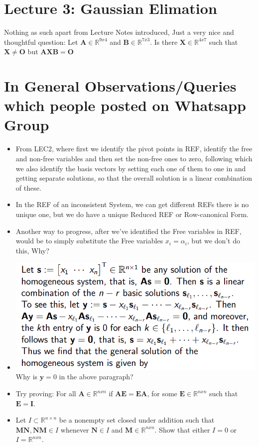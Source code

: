 \documentclass{article}
\begin{document}
\section{Lecture 3: Gaussian Elimation}
Nothing as such apart from Lecture Notes introduced,
Just a very nice and thoughtful question:
Let $\mathbf{A} \in \mathbb{R}^{9x4}$ and $\mathbf{B} \in \mathbb{R}^{7x3}$. Is there $\mathbf{X}
\in \mathbb{R}^{4x7}$ such that $\mathbf{X} \ne \mathbf{O}$ but $\mathbf{AXB = O}$

\section{In General Observations/Queries which people posted on Whatsapp Group}
\begin{itemize}
  \item From LEC2, where first we identify the pivot points in REF, identify the free and non-free variables
  and then set the non-free ones to zero, following which we also identify the basis vectors by setting each one of
  them to one in and getting separate solutions, so that the overall solution is a linear combination of these.

  \item In the REF of an inconsistent System, we can get different REFs there is no unique one, but we do have
  a unique Reduced REF or Row-canonical Form.

  \item Another way to progress, after we've identified the Free variables in REF, would be to simply substitute
  the Free variables $x_i = \alpha_i$, but we don't do this, Why?

  \item \includegraphics[scale = 0.5]{1.png} \\ Why is $\mathbf{y} = 0$ in the above paragraph?
  \item Try proving: For all $\mathbf{A} \in \mathbb{R}^{nxn}$ if  $\mathbf{AE=EA}$, for some $\mathbf{E} \in \mathbb{R}^{nxn}$
  such that $\mathbf{E = I}$.
  \item Let $I \subset \mathbb{R}^{n × n}$ be a nonempty set closed under addition such that $\mathbf{MN, NM} \in I $ whenever $\mathbf{N} \in I$ and $\mathbf{M} \in \mathbb{R}^{nxn}$. Show that either $I = 0$ or $I = \mathbb{R}^{nxn}$.
  \end{itemize}
\end{document}
